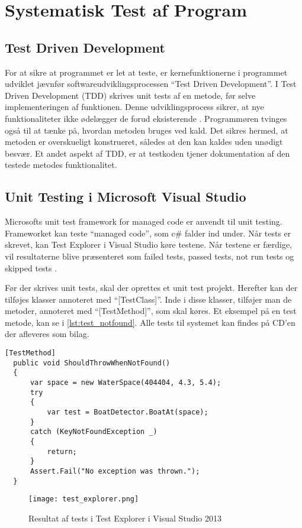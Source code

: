 \section{Systematisk Test af Program}
\label{sec:systematisk_test_af_program}

\subsection{Test Driven Development}
\label{sub:test_driven_development}


For at sikre at programmet er let at teste, er kernefunktionerne i programmet udviklet jævnfør softwareudviklingsprocessen \enquote{Test Driven Development}. I Test Driven Development (TDD) skrives unit tests af en metode, før selve implementeringen af funktionen. Denne udviklingsprocess sikrer, at nye funktionaliteter ikke ødelægger de forud eksisterende \cite{martin2006agile}. Programmøren tvinges også til at tænke på, hvordan metoden bruges ved kald. Det sikres hermed, at metoden er overskueligt konstrueret, således at den kan kaldes uden unødigt besvær. Et andet aspekt af TDD, er at testkoden tjener dokumentation af den testede metodes funktionalitet.

\subsection{Unit Testing i Microsoft Visual Studio}
\label{sub:unit_testing_i_microsoft_visual_studio}

Microsofts unit test framework for managed code er anvendt til unit testing. Frameworket kan teste \enquote{managed code}, som c\# falder ind under. Når tests er skrevet, kan Test Explorer i Visual Studio køre testene. Når testene er færdige, vil resultaterne blive præsenteret som failed tests, passed tests, not run tests og skipped tests \cite{msdn_unittest}.

Før der skrives unit tests, skal der oprettes et unit test projekt. Herefter kan der tilføjes klasser annoteret med \enquote{[TestClass]}. Inde i disse klasser, tilføjer man de metoder, annoteret med \enquote{[TestMethod]}, som skal køres. Et eksempel på en test metode, kan se i \cref{lst:test_notfound}.
Alle tests til systemet kan findes på CD'en der afleveres som bilag.

\begin{lstlisting}[label=lst:test_notfound, caption={Eksempel på testfunktion}]
  [TestMethod]
  public void ShouldThrowWhenNotFound()
  {
      var space = new WaterSpace(404404, 4.3, 5.4);
      try
      {
          var test = BoatDetector.BoatAt(space);
      }
      catch (KeyNotFoundException _)
      {
          return;
      }
      Assert.Fail("No exception was thrown.");
  }
\end{lstlisting}



\begin{figure}
  \centering
  \texttt{[image: test\_explorer.png]}
  \caption{Resultat af tests i Test Explorer i Visual Studio 2013}
  \label{fig:test_explorer}
\end{figure}

